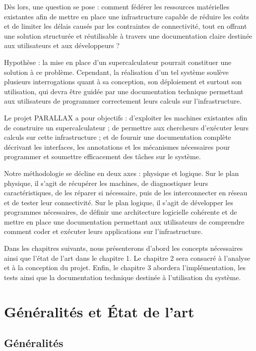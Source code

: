 \documentclass[12pt,a4paper]{report}
\theoremstyle{definition}
\begin{document}
Dès lors, une question se pose : comment fédérer les ressources matérielles existantes afin de mettre en place une infrastructure capable de réduire les coûts et de limiter les délais causés par les contraintes de connectivité, tout en offrant une solution structurée et réutilisable à travers une documentation claire destinée aux utilisateurs et aux développeurs ?

Hypothèse : la mise en place d’un supercalculateur pourrait constituer une solution à ce problème. Cependant, la réalisation d’un tel système soulève plusieurs interrogations quant à sa conception, son déploiement et surtout son utilisation, qui devra être guidée par une documentation technique permettant aux utilisateurs de programmer correctement leurs calculs sur l’infrastructure.

Le projet PARALLAX a pour objectifs :
d’exploiter les machines existantes afin de construire un supercalculateur ;
de permettre aux chercheurs d’exécuter leurs calculs sur cette infrastructure ;
et de fournir une documentation complète décrivant les interfaces, les annotations et les mécanismes nécessaires pour programmer et soumettre efficacement des tâches sur le système.

Notre méthodologie se décline en deux axes : physique et logique. Sur le plan physique, il s’agit de récupérer les machines, de diagnostiquer leurs caractéristiques, de les réparer si nécessaire, puis de les interconnecter en réseau et de tester leur connectivité. Sur le plan logique, il s’agit de développer les programmes nécessaires, de définir une architecture logicielle cohérente et de mettre en place une documentation permettant aux utilisateurs de comprendre comment coder et exécuter leurs applications sur l’infrastructure.

Dans les chapitres suivants, nous présenterons d’abord les concepts nécessaires ainsi que l’état de l’art dans le chapitre 1. Le chapitre 2 sera consacré à l’analyse et à la conception du projet. Enfin, le chapitre 3 abordera l’implémentation, les tests ainsi que la documentation technique destinée à l’utilisation du système.


\chapter{ Généralités et État de l’art}

\section{Généralités}
\end{document}

